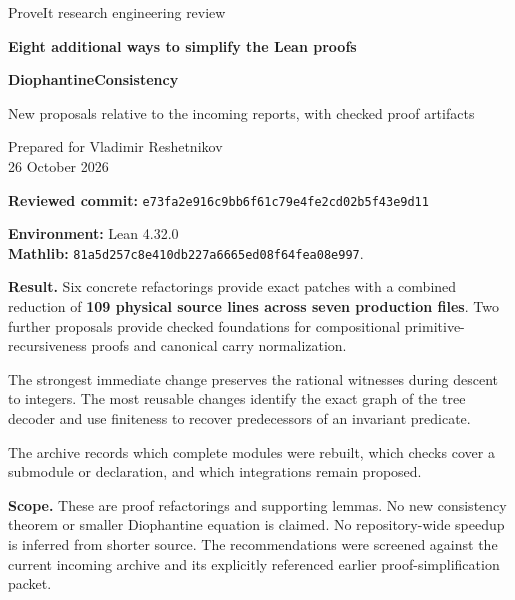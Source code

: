\documentclass[11pt,letterpaper]{article}
\newcommand{\code}[1]{\nolinkurl{#1}}
\newcommand{\snapshot}{\code{e73fa2e916c9bb6f61c79e4fe2cd02b5f43e9d11}}
\begin{document}
\hypersetup{pageanchor=false}
\begin{titlepage}
\vspace*{0.4in}
{\sffamily\color{ink}\Large ProveIt research engineering review\par}
\vspace{0.25in}
{\sffamily\bfseries\color{ink}\Huge Eight additional ways to simplify the Lean proofs\par}
\vspace{0.15in}
{\sffamily\bfseries\color{ink}\LARGE DiophantineConsistency\par}
\vspace{0.25in}
{\Large New proposals relative to the incoming reports, with checked proof artifacts\par}
\vspace{0.3in}
Prepared for Vladimir Reshetnikov\\26 October 2026\par
\vspace{0.18in}
\textbf{Reviewed commit:} \snapshot\par
\textbf{Environment:} Lean 4.32.0\\
\textbf{Mathlib:} \code{81a5d257c8e410db227a6665ed08f64fea08e997}.\par
\vspace{0.18in}
\colorbox{pale}{\parbox{0.94\textwidth}{\vspace{7pt}
\textbf{Result.} Six concrete refactorings provide exact patches with a combined reduction of \textbf{109 physical source lines across seven production files}. Two further proposals provide checked foundations for compositional primitive-recursiveness proofs and canonical carry normalization.\par
\vspace{5pt}
The strongest immediate change preserves the rational witnesses during descent to integers. The most reusable changes identify the exact graph of the tree decoder and use finiteness to recover predecessors of an invariant predicate.\par
\vspace{5pt}
The archive records which complete modules were rebuilt, which checks cover a submodule or declaration, and which integrations remain proposed.\vspace{7pt}}}\par
\vfill
\textbf{Scope.} These are proof refactorings and supporting lemmas. No new consistency theorem or smaller Diophantine equation is claimed. No repository-wide speedup is inferred from shorter source. The recommendations were screened against the current incoming archive and its explicitly referenced earlier proof-simplification packet.
\end{titlepage}
\hypersetup{pageanchor=true}
\tableofcontents
\clearpage
{}
\end{document}
